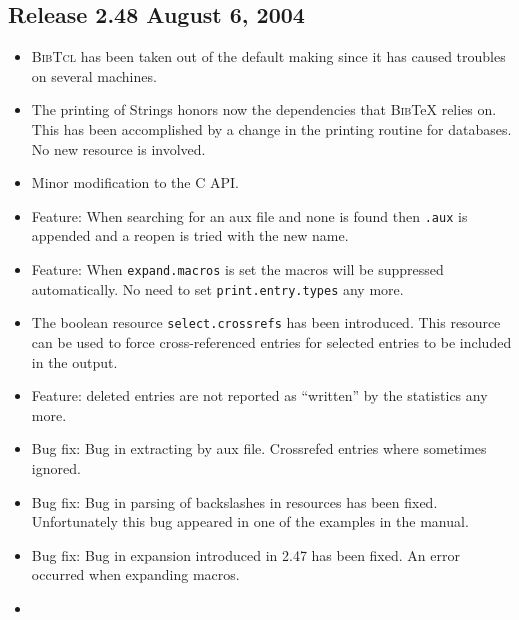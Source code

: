 \documentclass[11pt,a4paper]{scrartcl}
\newcommand\rsc[1]{\texttt{#1}}
\newcommand\BibTcl{\textsc{BibTcl}}
\newcommand\BibTeX{\textsc{Bib}\TeX}
\newenvironment{Release}[2]{%
  \def\tmp{#2}%
  \section*{Release #1 \ifx\tmp\empty\else{\normalsize[#2]}\fi}
  \begin{itemize}
}{\end{itemize}}
\newenvironment{Fix}[1]{\item }{}
\newenvironment{New}[1]{\item }{}
\newenvironment{Update}[1]{\item }{}
\begin{document}
\begin{multicols}
\begin{Release}{2.48}{August 6, 2004}
   \begin{Update}{gene}
     \BibTcl{} has been taken out of the default making since it has
     caused troubles on several machines.
   \end{Update}
   \begin{Update}{gene}
     The printing of Strings honors now the dependencies that
     \BibTeX{} relies on. This has been accomplished by a change in
     the printing routine for databases. No new resource is involved.
   \end{Update}
   \begin{Update}{gene}
     Minor modification to the C API.
   \end{Update}
  \begin{New}{gene}
    Feature: When searching for an aux file and none is found then
    \texttt{.aux} is appended and a reopen is tried with the new name.
  \end{New}
  \begin{Update}{gene}
    Feature: When \rsc{expand.macros} is set the macros will be
    suppressed automatically. No need to set \rsc{print.entry.types}
    any more.
  \end{Update}
  \begin{New}{gene}
    The boolean resource \rsc{select.crossrefs} has been introduced.
    This resource can be used to force cross-referenced entries for
    selected entries to be included in the output.
  \end{New}
  \begin{Update}{gene}
    Feature: deleted entries are not reported as "`written"' by the
    statistics any more.
  \end{Update}
  \begin{Fix}{gene}
    Bug fix: Bug in extracting by aux file. Crossrefed entries where
    sometimes ignored.
  \end{Fix}
  \begin{Fix}{gene}
    Bug fix: Bug in parsing of backslashes in resources has been fixed.
    Unfortunately this bug appeared in one of the examples in the
    manual.
  \end{Fix}
  \begin{Fix}{gene}
    Bug fix: Bug in expansion introduced in 2.47 has been fixed. An
    error occurred when expanding macros.
  \end{Fix}
  \begin{New}{gene}

\end{New}
\end{Release}
\end{multicols}
\end{document}
